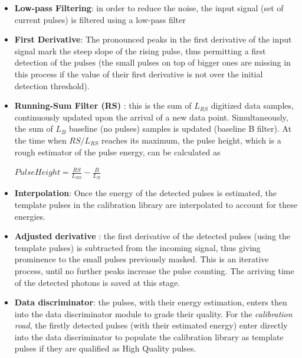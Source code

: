 \begin{itemize}
 \item \textbf{Low-pass Filtering}: in order to reduce the noise, the input signal (set of current pulses) is filtered using a low-pass filter
 \item \textbf{First Derivative}: The pronounced peaks in the first derivative of the input signal mark the steep slope of the rising pulse, thus 
 permitting a first detection of the pulses (the small pulses on top of bigger ones are missing in this process if the value of their first
 derivative is not over the initial detection threshold).
 \item \textbf{Running-Sum Filter (RS)} \citep{RS_2011}: this is the sum of $L_{RS}$ digitized data samples, continuously updated upon the arrival 
 of a new data point. Simultaneously, the sum of $L_B$ baseline (no pulses) samples is updated (baseline B filter).
 At the time when $RS/L_{RS}$ reaches its maximum, the pulse height, which is a rough estimator of the pulse energy, can 
 be calculated as 
 
 $ PulseHeight = \frac{RS}{L_{RS}} - \frac{B}{L_B} $
 
 \item \textbf{Interpolation}: Once the energy of the detected pulses is estimated, the template pulses in the calibration library are interpolated to account 
 for these energies.
 \item \textbf{Adjusted derivative} \citep{Boyce_1999}: the first derivative of the detected pulses (using the template pulses) is subtracted from the incoming signal, thus 
 giving prominence to the small pulses previously masked. This is an iterative process, until no further peaks increase the pulse counting.
 The arriving time of the detected photons is saved at this stage. 
 \item \textbf{Data discriminator}: the pulses, with their energy estimation, enters then into the data discriminator module to grade their quality. For 
 the \textit{calibration road}, the firstly detected pulses (with their estimated energy) enter directly into the data discriminator to populate the
 calibration library as template pulses if they are qualified as High Quality pulses.
\end{itemize}


